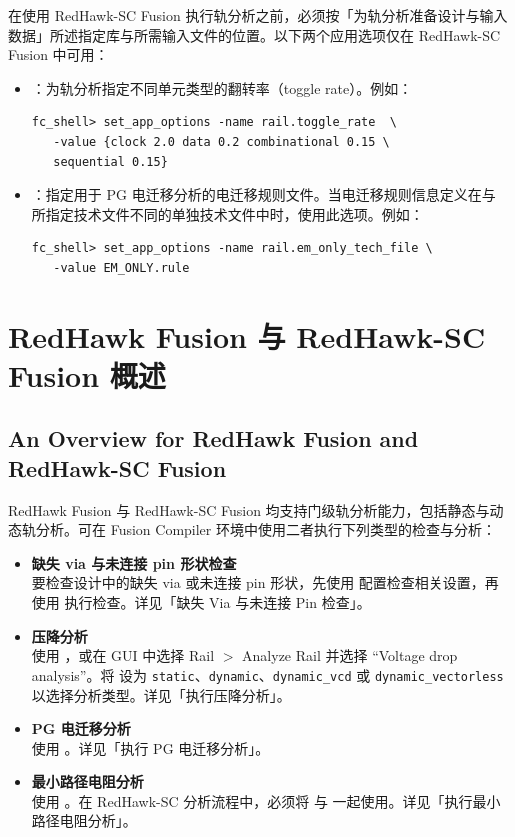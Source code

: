 在使用 RedHawk-SC Fusion 执行轨分析之前，必须按「为轨分析准备设计与输入数据」所述指定库与所需输入文件的位置。以下两个应用选项仅在 RedHawk-SC Fusion 中可用：

\begin{itemize}
  \item {}：为轨分析指定不同单元类型的翻转率（toggle rate）。例如：
\begin{lstlisting}
fc_shell> set_app_options -name rail.toggle_rate  \
   -value {clock 2.0 data 0.2 combinational 0.15 \
   sequential 0.15}
\end{lstlisting}
  \item {}：指定用于 PG 电迁移分析的电迁移规则文件。当电迁移规则信息定义在与  所指定技术文件不同的单独技术文件中时，使用此选项。例如：
\begin{lstlisting}
fc_shell> set_app_options -name rail.em_only_tech_file \
   -value EM_ONLY.rule
\end{lstlisting}
\end{itemize}

\section{RedHawk Fusion 与 RedHawk-SC Fusion 概述}
\subsection*{An Overview for RedHawk Fusion and RedHawk-SC Fusion}

RedHawk Fusion 与 RedHawk-SC Fusion 均支持门级轨分析能力，包括静态与动态轨分析。可在 Fusion Compiler 环境中使用二者执行下列类型的检查与分析：

\begin{itemize}
  \item \textbf{缺失 via 与未连接 pin 形状检查}\\
    要检查设计中的缺失 via 或未连接 pin 形状，先使用  配置检查相关设置，再使用   执行检查。详见「缺失 Via 与未连接 Pin 检查」。
  \item \textbf{压降分析}\\
    使用 \cmd{analyze\_rail} ，或在 GUI 中选择 Rail $>$ Analyze Rail 并选择 ``Voltage drop analysis''。将  设为 \texttt{static}、\texttt{dynamic}、\texttt{dynamic\_vcd} 或 \texttt{dynamic\_vectorless} 以选择分析类型。详见「执行压降分析」。
  \item \textbf{PG 电迁移分析}\\
    使用  。详见「执行 PG 电迁移分析」。
  \item \textbf{最小路径电阻分析}\\
    使用 \cmd{analyze\_rail} 。在 RedHawk-SC 分析流程中，必须将  与  一起使用。详见「执行最小路径电阻分析」。
\end{itemize}

